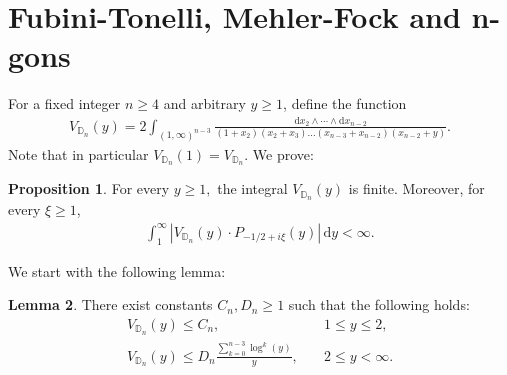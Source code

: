 \documentclass{amsart}
\newcommand{\DD}{\mathbb{D}}
\theoremstyle{definition}
\newtheorem{proposition}{Proposition}[section]
\newtheorem{lemma}[proposition]{Lemma}
\begin{document}
\section{Fubini-Tonelli, Mehler-Fock and n-gons}
For a fixed integer $n\geqslant4$ and arbitrary $y\geqslant 1$, define the function
\begin{align}
V_{\DD_n}(y) = 2\int_{(1,\infty)^{n-3}} \frac{\mathrm{d}x_2\wedge\cdots\wedge \mathrm{d}x_{n-2}}{(1+x_2)(x_2+x_3)\dotsc(x_{n-3}+x_{n-2})(x_{n-2}+y)}. 
\end{align}
Note that in particular $V_{\DD_{n}}(1)=V_{\DD_n}$. We prove:
\begin{proposition}
\label{prop:fubini-tonelli}
For every $y\geqslant 1,$ the integral $V_{\DD_n}(y)$ is finite. Moreover, for every $\xi\geqslant1$,
\begin{align}
    \int_1^\infty |V_{\DD_n}(y)\cdot P_{-1/2+i\xi}(y)|\,\mathrm{d}y <\infty.
\end{align}
\end{proposition}
We start with the following lemma:
\begin{lemma}
\label{lem:fubini-tonelli}
There exist constants $C_n,D_n\geqslant1$ such that the following holds:
\begin{equation}
\begin{split}
    V_{\DD_{n}}(y) \leqslant C_n,& \quad1\leqslant y\leqslant 2,
    \\
    V_{\DD_{n}}(y) \leqslant D_n \frac{\sum_{k=0}^{n-3}\log^k(y)}{y},& \quad 2\leqslant y < \infty.
\end{split}
\end{equation}
\end{lemma}
\end{document}
